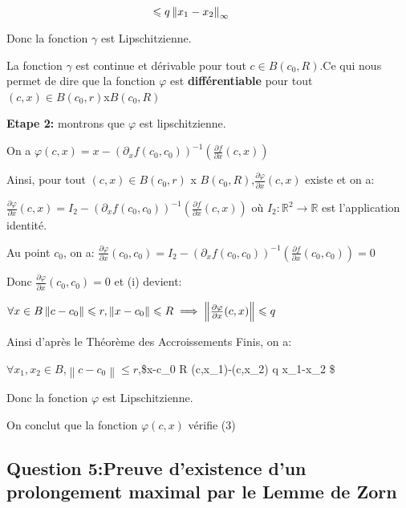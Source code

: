 \documentclass[11pt]{article}
\begin{document}
\(\hspace{130px}\leqslant q \left\lVert x_1 -x_2 \right\lVert _\infty\)

Donc la fonction \(\gamma\) est Lipschitzienne.

La fonction \(\gamma\) est continue et dérivable pour tout
\(c\in B(c_0,R)\).Ce qui nous permet de dire que la fonction \(\varphi\)
est \textbf{différentiable} pour tout \((c,x)\in B(c_0,r)\)x\(B(c_0,R)\)

\textbf{Etape 2:} montrons que \(\varphi\) est lipschitzienne.

On a
\(\varphi(c,x)=x-(\partial _x f(c_0,c_0))^{-1}(\frac{\partial f}{\partial x}(c,x))\)

Ainsi, pour tout \((c,x)\in B(c_0,r)\) x
\(B(c_0,R)\),\(\frac{\partial \varphi}{\partial x}(c,x)\) existe et on
a:

\(\frac{\partial \varphi}{\partial x}(c,x)=I_2-(\partial _x f(c_0,c_0))^{-1}(\frac{\partial f}{\partial x}(c,x))\)
où \(I_2: \mathbb{R}^2 \longrightarrow \mathbb{R}\) est l'application
identité.

Au point \(c_0\), on a:
\(\frac{\partial \varphi}{\partial x}(c_0,c_0)=I_2-(\partial _x f(c_0,c_0))^{-1}(\frac{\partial f}{\partial x}(c_0,c_0))=0\)

Donc \(\frac{\partial \varphi}{\partial x}(c_0,c_0)=0\) et (i) devient:

\(\forall x \in B \left\lVert c-c_0 \right\lVert \leqslant r,\left\lVert x-c_0 \right\lVert \leqslant R \implies \left\lVert \frac{\partial \varphi}{\partial x}(c,x)\right\lVert \leqslant q \hspace{50px}\)

Ainsi d'après le Théorème des Accroissements Finis, on a:

\(\forall x_1, x_2 \in B\),\(\left\lVert c-c_0 \right\lVert \leqslant r\),\$\left\lVert x-c\_0
\right\lVert \leqslant R
\implies \left\lVert \varphi (c,x\_1)-\varphi(c,x\_2)
\right\lVert \leqslant q \left\lVert x\_1-x\_2 \right\lVert \$

Donc la fonction \(\varphi\) est Lipschitzienne.

On conclut que la fonction \(\varphi (c,x)\) vérifie (3)

    \hypertarget{question-5preuve-dexistence-dun-prolongement-maximal-par-le-lemme-de-zorn}{%
\subsection{\texorpdfstring{\textbf{Question 5:Preuve d'existence d'un
prolongement maximal par le Lemme de
Zorn}}{Question 5:Preuve d'existence d'un prolongement maximal par le Lemme de Zorn}}\label{question-5preuve-dexistence-dun-prolongement-maximal-par-le-lemme-de-zorn}}
\end{document}
